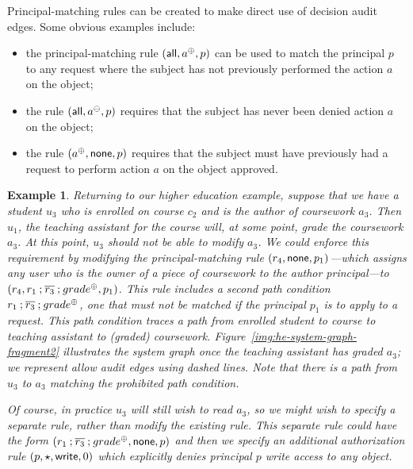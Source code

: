 \documentclass{article}
\newtheorem{example}{Example}
\newcommand{\auditd}[1]{\ensuremath{#1^\ominus}}
\begin{document}
Principal-matching rules can be created to make direct use of decision audit edges.
Some obvious examples include:
 \begin{itemize}
  \item the principal-matching rule $(\mathsf{all}, a^\oplus, p)$ can be used to match the principal $p$ to any request where the subject has not previously performed the action $a$ on the object;
  \item the rule $(\all, \auditd{a}, p)$ requires that the subject has never been denied action $a$ on the object;
  \item the rule $(a^\oplus, \mathsf{none}, p)$ requires that the subject must have previously had a request to perform action $a$ on the object approved.
 \end{itemize}

\begin{example}\label{ex:higher-education-2}
Returning to our higher education example, suppose that we have a student $u_3$ who is enrolled on course $c_2$ and is the author of coursework $a_3$.
Then $u_1$, the teaching assistant for the course will, at some point, grade the coursework $a_3$.
At this point, $u_3$ should not be able to modify $a_3$.
We could enforce this requirement by modifying the principal-matching rule $(r_4,\mathsf{none},p_1)$---which assigns any user who is the owner of a piece of coursework to the author principal---to $(r_4,r_1 \mathbin{;} \overline{r_3} \mathbin{;} grade^\oplus,p_1)$.
This rule includes a second path condition $r_1 \mathbin{;} \overline{r_3} \mathbin{;} grade^\oplus$, one that must not be matched if the principal $p_1$ is to apply to a request.
This path condition traces a path from enrolled student to course to teaching assistant to (graded) coursework.
Figure~\ref{img:he-system-graph-fragment2} illustrates the system graph once the teaching assistant has graded $a_3$; we represent allow audit edges using dashed lines.
Note that there is a path from $u_3$ to $a_3$ matching the prohibited path condition.

Of course, in practice $u_3$ will still wish to read $a_3$, so we might wish to specify a separate rule, rather than modify the existing rule.
This separate rule could have the form $(r_1 \mathbin{;} \overline{r_3} \mathbin{;} grade^\oplus, \mathsf{none}, p)$ and then we specify an additional authorization rule $(p,\star,\textsf{write},0)$ which explicitly denies principal $p$ write access to any object.


\end{example}
\end{document}
